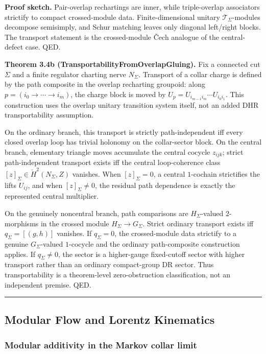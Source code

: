 \textbf{Proof sketch.} Pair-overlap rechartings are inner, while triple-overlap associators strictify to compact crossed-module data. Finite-dimensional unitary \(\mathcal T_\Sigma\)-modules decompose semisimply, and Schur matching leaves only diagonal left/right blocks. The transport statement is the crossed-module \v{C}ech analogue of the central-defect case. QED.

\textbf{Theorem 3.4b (TransportabilityFromOverlapGluing).} Fix a connected cut \(\Sigma\) and a finite regulator charting nerve \(N_\Sigma\). Transport of a collar charge is defined by the path composite in the overlap recharting groupoid: along \(p=(i_0\to\cdots\to i_m)\), the charge block is moved by \(U_p=U_{i_{m-1}i_m}\cdots U_{i_0i_1}\). This construction uses the overlap unitary transition system itself, not an added DHR transportability assumption.

On the ordinary branch, this transport is strictly path-independent iff every closed overlap loop has trivial holonomy on the collar-sector block. On the central branch, elementary triangle moves accumulate the central cocycle \(z_{ijk}\); strict path-independent transport exists iff the central loop-coherence class \([z]_\Sigma\in\check H^2(N_\Sigma,Z)\) vanishes. When \([z]_\Sigma=0\), a central \(1\)-cochain strictifies the lifts \(U_{ij}\), and when \([z]_\Sigma\ne0\), the residual path dependence is exactly the represented central multiplier.

On the genuinely noncentral branch, path comparisons are \(H_\Sigma\)-valued \(2\)-morphisms in the crossed module \(H_\Sigma\to G_\Sigma\). Strict ordinary transport exists iff \(q_\Sigma=[(g,h)]\) vanishes. If \(q_\Sigma=0\), the crossed-module data strictify to a genuine \(G_\Sigma\)-valued \(1\)-cocycle and the ordinary path-composite construction applies. If \(q_\Sigma\ne0\), the sector is a higher-gauge fixed-cutoff sector with higher transport rather than an ordinary compact-group DR sector. Thus transportability is a theorem-level zero-obstruction classification, not an independent premise. QED.

\begin{center}\rule{0.5\linewidth}{0.5pt}\end{center}
\subsection{Modular Flow and Lorentz Kinematics}\label{4-modular-flow-and-lorentz-kinematics}

\subsubsection{Modular additivity in the Markov collar limit}\label{41-modular-additivity-in-the-markov-collar-limit}

